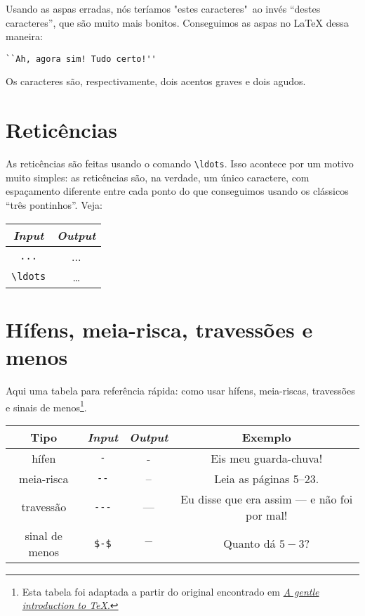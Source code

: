 Usando as aspas erradas, nós teríamos "estes caracteres"\, ao invés ``destes caracteres'', que são muito mais bonitos. Conseguimos as aspas no \LaTeX{} dessa maneira:

\begin{verbatim}
``Ah, agora sim! Tudo certo!''
\end{verbatim}

Os caracteres são, respectivamente, dois acentos graves e dois agudos.

\section{Reticências}

As reticências são feitas usando o comando \verb+\ldots+. Isso acontece por um motivo muito simples: as reticências são, na verdade, um único caractere, com espaçamento diferente entre cada ponto do que conseguimos usando os clássicos ``três pontinhos''. Veja:

\begin{center}
\begin{tabular}{c c}
\bf \emph{Input}	&	\bf \emph{Output}	\\
\hline
\verb+...+		& 	...			\\
\verb+\ldots+		&	\ldots			\\
\end{tabular}
\end{center}

\section{Hífens, meia-risca, travessões e menos}

Aqui uma tabela para referência rápida: como usar hífens, meia-riscas, travessões e sinais de menos\footnote{Esta tabela foi adaptada a partir do original encontrado em \href{www.ctan.org/tex-archive/info/gentle/gentle.pdf}{\emph{A gentle introduction to \TeX}.}}.

\begin{center}
\begin{tabular}{ c c c c }
\bf Tipo & \bf \emph{Input} & \bf \emph{Output} & \bf Exemplo \\ 
\hline
hífen & \verb+-+ & - & Eis meu guarda-chuva! \\
meia-risca & \verb+--+ & -- & Leia as páginas 5--23. \\
travessão & \verb+---+ & --- & Eu disse que era assim --- e não foi por mal! \\
sinal de menos & \verb+$-$+ & $-$ & Quanto dá $5 - 3$? \\
\end{tabular}
\end{center}

